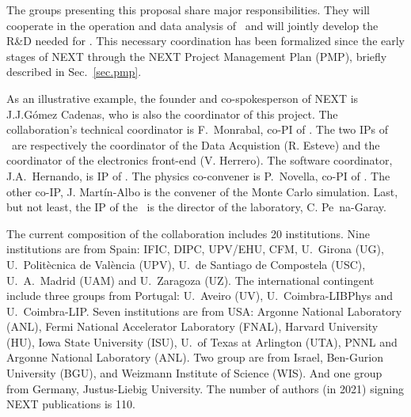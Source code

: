  The groups presenting this proposal share major responsibilities. They will cooperate in the operation and data analysis of \Next\ and will jointly develop the R\&D needed for \NHD. This necessary coordination has been formalized since the early stages of NEXT through the NEXT Project Management Plan (PMP), briefly described in Sec.~\ref{sec.pmp}.


As an illustrative example, the founder and co-spokesperson of NEXT is  J.J.G\'omez Cadenas, who is also the coordinator of this project.  The collaboration's technical coordinator is F.~Monrabal, co-PI of \sDIPC. The two IPs of \sUPV\ are respectively the coordinator of the Data Acquistion (R. Esteve) and the coordinator of the electronics front-end (V. Herrero). The software coordinator, J.A.~Hernando, is IP of \sUSC.  The physics co-convener is P.~Novella, co-PI of \sIFIC. The other co-IP, J. Martín-Albo is the convener of the Monte Carlo simulation. Last, but not least, the IP of the \sLSC\ is the director of the laboratory, C. Pe~na-Garay.  


The current composition of the collaboration includes 20 institutions. Nine institutions are from Spain:  IFIC, DIPC,  UPV/EHU, CFM, U.~Girona (UG), U.~Polit\`ecnica de Val\`encia (UPV), U.~de Santiago de Compostela (USC), U.~A.~Madrid (UAM) and U.~Zaragoza (UZ). The international contingent include three groups from Portugal: U.~Aveiro (UV), U.~Coimbra-LIBPhys and U.~Coimbra-LIP. Seven institutions are from USA: Argonne National Laboratory (ANL), Fermi National Accelerator Laboratory (FNAL), Harvard University (HU), Iowa State University (ISU), U.~of Texas at Arlington (UTA), PNNL  and Argonne National Laboratory (ANL). Two group are from Israel, Ben-Gurion University (BGU), and Weizmann Institute of Science (WIS). And one group from Germany, Justus-Liebig University. The number of authors (in 2021) signing NEXT publications is 110. 

